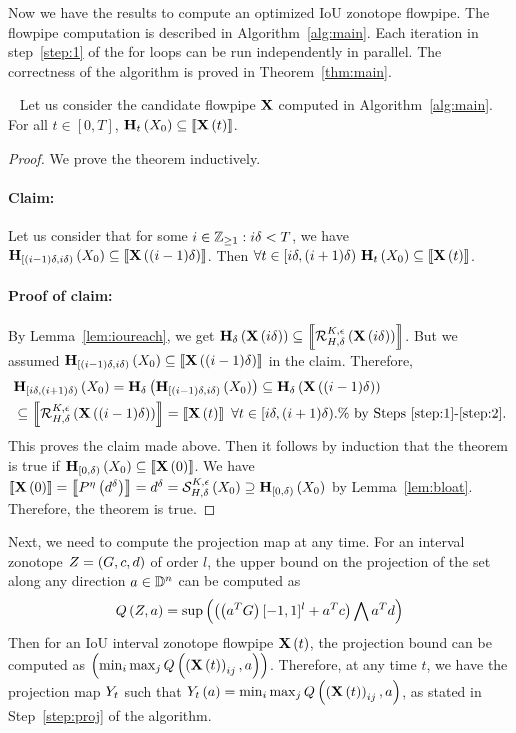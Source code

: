 Now we have the results to compute an optimized IoU zonotope flowpipe.
The flowpipe computation is described in Algorithm~\ref{alg:main}.
Each iteration in step~\ref{step:1} of the for loops can be run independently
in parallel.  The correctness of the algorithm is proved in
Theorem~\ref{thm:main}.
%
\begin{theorem}~\label{thm:main}
Let us consider the candidate flowpipe $\mathbf{X}$ computed in
Algorithm~\ref{alg:main}.  For all $t\in[0,T]$,
$\mathbf{H}_{t}\left(X_0\right)\subseteq \left\llbracket{\mathbf{X}\left(t\right)}\right\rrbracket$.
\end{theorem}
%
\begin{proof}
We prove the theorem inductively.

\paragraph{Claim:}  Let us consider that for some
$i\in\mathbb{Z}_{\geq 1}:i\delta<T$, we have
$\mathbf{H}_{[(i-1)\delta,i\delta)}\left(X_0\right)\subseteq\left\llbracket{\mathbf{X}\left((i-1)\delta\right)}\right\rrbracket$.
Then $\forall
t\in[i\delta,(i+1)\delta)~\mathbf{H}_{t}\left(X_0\right)\subseteq {\left\llbracket{\mathbf{X}\left(t\right)}\right\rrbracket}$.

\paragraph{Proof of claim:}
By Lemma~\ref{lem:ioureach}, we get
$\mathbf{H}_{\delta}\left(\mathbf{X}\left(i\delta\right)\right)\subseteq \left\llbracket{\mathcal{R}_{H,\delta}^{K,\epsilon}\left(\mathbf{X}\left(i\delta\right)\right)}\right\rrbracket$.
But we assumed
$\mathbf{H}_{[(i-1)\delta,i\delta)}\left(X_0\right)\subseteq\left\llbracket{\mathbf{X}\left((i-1)\delta\right)}\right\rrbracket$
in the claim.  Therefore,
%
\begin{align*}
& \mathbf{H}_{[i\delta,(i+1)\delta)}\left(X_0\right)
= \mathbf{H}_{\delta}\left(\mathbf{H}_{[(i-1)\delta,i\delta)}\left(X_0\right)\right) \subseteq \mathbf{H}_{\delta}\left(\mathbf{X}\left((i-1)\delta\right)\right)\\
&\subseteq \left\llbracket{\mathcal{R}_{H,\delta}^{K,\epsilon}\left(\mathbf{X}\left((i-1)\delta\right)\right)}\right\rrbracket
= \left\llbracket{\mathbf{X}\left(t\right)}\right\rrbracket~\forall t\in[i\delta,(i+1)\delta).\%~\text{by
Steps~\ref{step:1}-\ref{step:2}.}
\end{align*}
%
This proves the claim made above.
%
Then it follows by induction that the theorem is true if
$\mathbf{H}_{[0,\delta)}\left(X_0\right)\subseteq \left\llbracket{\mathbf{X}\left(0\right)}\right\rrbracket$.  We have
$\left\llbracket{\mathbf{X}\left(0\right)}\right\rrbracket = \left\llbracket{P^{\eta}\left(d^\delta\right)}\right\rrbracket
= d^\delta
= \mathcal{S}_{H,\delta}^{K,\epsilon}\left(X_0\right)\supseteq \mathbf{H}_{[0,\delta)}\left(X_0\right)$
by Lemma~\ref{lem:bloat}.  Therefore, the theorem is true.
\end{proof}
%
Next, we need to compute the projection map at any time.  For an
interval zonotope $Z = \left(G,c,d\right)$ of order $l$, the upper
bound on the projection of the set along any direction $a\in\mathbb{D}^n$
can be computed as
%
\[
Q\left(Z,a\right) = \sup\left(\left(\left(a^TG\right)[-1,1]^l+a^Tc\right)\bigwedge a^Td\right)
\]
%
Then for an IoU interval zonotope flowpipe $\mathbf{X}\left(t\right)$, the projection
bound can be computed as
$\left(\min_i\max_jQ\left(\left(\mathbf{X}\left(t\right)\right)_{ij},a\right)\right)$.  Therefore, at any
time $t$, we have the projection map $Y_{t}$ such that
$Y_{t}\left(a\right) = \min_i\max_jQ\left(\left(\mathbf{X}\left(t\right)\right)_{ij},a\right)$,
as stated in Step~\ref{step:proj} of the algorithm.

